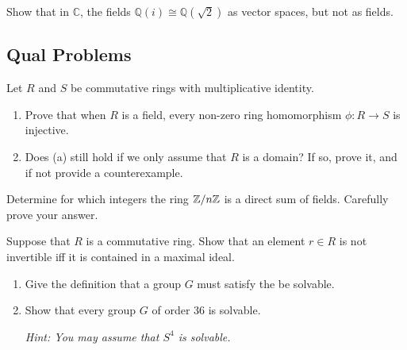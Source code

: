 \begin{problem}[Hungerford 5.1.16]
Show that in $\mathbb{C}$, the fields $\mathbb{Q}(i) \cong \mathbb{Q}(\sqrt 2)$ as vector spaces, but not as fields.
\label{prob:1.1}
\end{problem}

\newpage
\subsection{Qual Problems}

\begin{problem}
Let $R$ and $S$ be commutative rings with multiplicative identity.

\begin{enumerate}
    \item Prove that when $R$ is a field, every non-zero ring homomorphism $\phi: R\to S$ is injective.
    \item Does (a) still hold if we only assume that $R$ is a domain? If so, prove it, and if not provide a counterexample.
\end{enumerate}
\end{problem}

\begin{problem}
Determine for which integers the ring $\Bbb{Z}/n\Bbb{Z}$ is a direct sum of fields. Carefully prove your answer.
\end{problem}

\begin{problem}
Suppose that $R$ is a commutative ring. Show that an element $r\in R$ is not invertible iff it is contained in a maximal ideal.
\end{problem}

\begin{problem}\hfill

\begin{enumerate}
    \item Give the definition that a group $G$ must satisfy the be solvable.
    \item Show that every group $G$ of order 36 is solvable.
    
    \textit{Hint: You may assume that $S^4$ is solvable.}
\end{enumerate}
\end{problem}